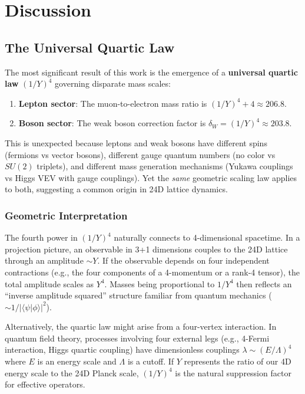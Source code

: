 \documentclass[11pt,a4paper]{article}
\begin{document}
\section{Discussion}

\subsection{The Universal Quartic Law}

The most significant result of this work is the emergence of a \textbf{universal quartic law} $(1/Y)^4$ governing disparate mass scales:
\begin{enumerate}
\item \textbf{Lepton sector}: The muon-to-electron mass ratio is $(1/Y)^4 + 4 \approx 206.8$.
\item \textbf{Boson sector}: The weak boson correction factor is $\delta_W = (1/Y)^4 \approx 203.8$.
\end{enumerate}

This is unexpected because leptons and weak bosons have different spins (fermions vs vector bosons), different gauge quantum numbers (no color vs $SU(2)$ triplets), and different mass generation mechanisms (Yukawa couplings vs Higgs VEV with gauge couplings). Yet the \emph{same} geometric scaling law applies to both, suggesting a common origin in 24D lattice dynamics.

\subsubsection{Geometric Interpretation}

The fourth power in $(1/Y)^4$ naturally connects to 4-dimensional spacetime. In a projection picture, an observable in 3+1 dimensions couples to the 24D lattice through an amplitude $\sim Y$. If the observable depends on four independent contractions (e.g., the four components of a 4-momentum or a rank-4 tensor), the total amplitude scales as $Y^4$. Masses being proportional to $1/Y^4$ then reflects an ``inverse amplitude squared'' structure familiar from quantum mechanics ($\sim 1/|\langle \psi | \phi \rangle|^2$).

Alternatively, the quartic law might arise from a four-vertex interaction. In quantum field theory, processes involving four external legs (e.g., 4-Fermi interaction, Higgs quartic coupling) have dimensionless couplings $\lambda \sim (E/\Lambda)^4$ where $E$ is an energy scale and $\Lambda$ is a cutoff. If $Y$ represents the ratio of our 4D energy scale to the 24D Planck scale, $(1/Y)^4$ is the natural suppression factor for effective operators.
\end{document}
